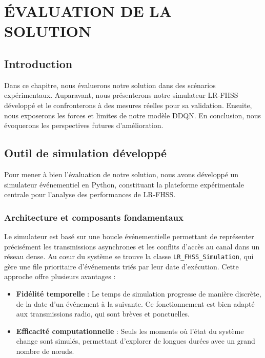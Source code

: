 \chapter{ÉVALUATION DE LA SOLUTION}

\section{Introduction}
\label{sec:intro-evaluation}

Dans ce chapitre, nous évaluerons notre solution dans des scénarios expérimentaux. Auparavant, nous présenterons notre simulateur LR-FHSS développé et le confronterons à des mesures réelles pour sa validation. Ensuite, nous exposerons les forces et limites de notre modèle DDQN. En conclusion, nous évoquerons les perspectives futures d'amélioration.

\section{Outil de simulation développé}
\label{sec:outil-simulation}

Pour mener à bien l'évaluation de notre solution, nous avons développé un simulateur événementiel en Python, constituant la plateforme expérimentale centrale pour l'analyse des performances de LR-FHSS.

\subsection{Architecture et composants fondamentaux}

	Le simulateur est basé sur une boucle événementielle permettant de représenter précisément les transmissions asynchrones et les conflits d'accès au canal dans un réseau dense. Au cœur du système se trouve la classe \texttt{LR\_FHSS\_Simulation}, qui gère une file prioritaire d'événements triés par leur date d'exécution. Cette approche offre plusieurs avantages :
	
	\begin{itemize}
		\item \textbf{Fidélité temporelle} : Le temps de simulation progresse de manière discrète, de la date d'un événement à la suivante. Ce fonctionnement est bien adapté aux transmissions radio, qui sont brèves et ponctuelles.
		
		\item \textbf{Efficacité computationnelle} : Seuls les moments où l'état du système change sont simulés, permettant d'explorer de longues durées avec un grand nombre de nœuds.
	\end{itemize}

